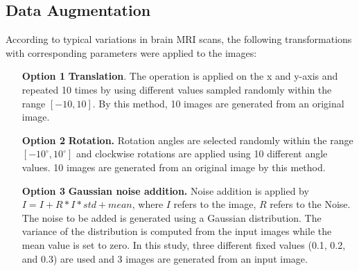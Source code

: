 \subsection{Data Augmentation}

According to typical variations in brain MRI scans, the following transformations with corresponding parameters were applied to the images:
\begin{itemize}
    \item[\textbf{Option 1}] \textbf{Translation}. The operation is applied on the x and y-axis and repeated 10 times by using different values sampled randomly within the range $\left[-10, 10\right]$. By this method, 10 images are generated from an original image.
    \item[\textbf{Option 2}] \textbf{Rotation.} Rotation angles are selected randomly within the range  $\left[-10^{\circ}, 10^{\circ}\right]$ and clockwise rotations are applied using 10 different angle values. 10 images are generated from an original image by this method.
    \item[\textbf{Option 3}] \textbf{Gaussian noise addition.} Noise addition is applied by \mbox{$I=I+R*I*std+mean$}, where $I$ refers to the image, $R$ refers to the Noise. The noise to be added is generated using a Gaussian distribution. The variance of the distribution is computed from the input images while the mean value is set to zero. In this study, three different fixed values (0.1, 0.2, and 0.3) are used and 3 images are generated from an input image.

\end{itemize}
